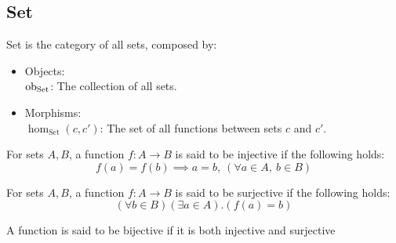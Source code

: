 \subsection{Set}
\begin{definition}[Set]
  Set is the category of all sets, composed by:
  \parencite{awodey:category_theory}
  \begin{itemize}
    \item Objects:\\
      $\mathrm{ob}_{\mathrm{Set}}$: The collection of all sets.
    \item Morphisms:\\
      $\hom_{\mathrm{Set}}(c, c')$: The set of all functions between sets $c$ and
      $c'$.
  \end{itemize}
\end{definition}

\begin{definition}
  For sets $A,B$, a function $f:A\to B$ is said to be injective if the following
  holds:
  \[f(a)=f(b) \implies a=b,\ (\forall a\in A,\ b\in B)\]
\end{definition}

\begin{definition}
  For sets $A,B$, a function $f:A\to B$ is said to be surjective if the
  following holds:
  \[(\forall b\in B)(\exists a\in A).(f(a)=b)\]
\end{definition}

\begin{definition}
  A function is said to be bijective if it is both injective and surjective
\end{definition}

